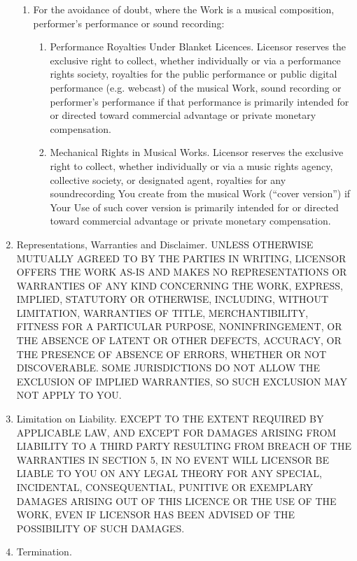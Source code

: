 \begin{enumerate}
\begin{enumerate}
         \item For the avoidance of doubt, where the Work is a musical composition, performer's performance or sound recording:
	 \begin{enumerate}
               \item Performance Royalties Under Blanket Licences. Licensor reserves the exclusive right to collect, whether individually or via a performance rights society, royalties for the public performance or public digital performance (e.g. webcast) of the musical Work, sound recording or performer's performance if that performance is primarily intended for or directed toward commercial advantage or private monetary compensation.
               \item Mechanical Rights in Musical Works. Licensor reserves the exclusive right to collect, whether individually or via a music rights agency, collective society, or designated agent, royalties for any soundrecording You create from the musical Work \linebreak (``cover version'') if Your Use of such cover version is primarily intended for or directed toward commercial advantage or private monetary compensation.
	\end{enumerate}
	\end{enumerate}
   \item Representations, Warranties and Disclaimer. UNLESS OTHERWISE MUTUALLY AGREED TO BY THE PARTIES IN WRITING, LICENSOR OFFERS THE WORK AS-IS AND MAKES NO REPRESENTATIONS OR WARRANTIES OF ANY KIND CONCERNING THE WORK, EXPRESS, IMPLIED, STATUTORY OR OTHERWISE, INCLUDING, \linebreak WITHOUT LIMITATION, WARRANTIES OF TITLE, MERCHANTIBILITY, FITNESS FOR A PARTICULAR PURPOSE, NONINFRINGEMENT, OR THE ABSENCE OF LATENT OR OTHER DEFECTS, ACCURACY, OR THE PRESENCE OF ABSENCE OF ERRORS, WHETHER OR NOT DISCOVERABLE. SOME JURISDICTIONS DO NOT ALLOW THE EXCLUSION OF IMPLIED WARRANTIES, SO SUCH EXCLUSION MAY NOT APPLY TO YOU.
   \item Limitation on Liability. EXCEPT TO THE EXTENT REQUIRED BY APPLICABLE LAW, AND EXCEPT FOR DAMAGES ARISING FROM LIABILITY TO A THIRD PARTY RESULTING FROM BREACH OF THE WARRANTIES IN SECTION 5, IN NO EVENT WILL LICENSOR BE LIABLE TO YOU ON ANY LEGAL THEORY FOR ANY SPECIAL, INCIDENTAL, CONSEQUENTIAL, PUNITIVE OR EXEMPLARY DAMAGES ARISING OUT OF THIS LICENCE OR THE USE OF THE WORK, EVEN IF LICENSOR HAS BEEN ADVISED OF THE POSSIBILITY OF SUCH DAMAGES.
   \item Termination.
	\begin{enumerate}

\end{enumerate}
\end{enumerate}
